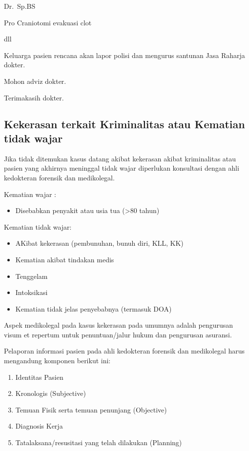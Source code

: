 \documentclass[
]{book}
\providecommand{\tightlist}{%
  \setlength{\itemsep}{0pt}\setlength{\parskip}{0pt}}
\begin{document}
Dr.~Sp.BS

Pro Craniotomi evakuasi clot

dll

Keluarga pasien rencana akan lapor polisi dan mengurus santunan Jasa Raharja dokter.

Mohon adviz dokter.

Terimakasih dokter.

\hypertarget{kekerasan-terkait-kriminalitas-atau-kematian-tidak-wajar}{%
\subsection{Kekerasan terkait Kriminalitas atau Kematian tidak wajar}\label{kekerasan-terkait-kriminalitas-atau-kematian-tidak-wajar}}

Jika tidak ditemukan kasus datang akibat kekerasan akibat kriminalitas atau pasien yang akhirnya meninggal tidak wajar diperlukan konsultasi dengan ahli kedokteran forensik dan medikolegal.

Kematian wajar :

\begin{itemize}
\tightlist
\item
  Disebabkan penyakit atau usia tua (\textgreater80 tahun)
\end{itemize}

Kematian tidak wajar:

\begin{itemize}
\item
  AKibat kekerasan (pembunuhan, bunuh diri, KLL, KK)
\item
  Kematian akibat tindakan medis
\item
  Tenggelam
\item
  Intoksikasi
\item
  Kematian tidak jelas penyebabnya (termasuk DOA)
\end{itemize}

Aspek medikolegal pada kasus kekerasan pada umumnya adalah pengurusan visum et repertum untuk penuntuan/jalur hukum dan pengurusan asuransi.

Pelaporan informasi pasien pada ahli kedokteran forensik dan medikolegal harus mengandung komponen berikut ini:

\begin{enumerate}
\def\labelenumi{\arabic{enumi}.}
\item
  Identitas Pasien
\item
  Kronologis (Subjective)
\item
  Temuan Fisik serta temuan penunjang (Objective)
\item
  Diagnosis Kerja
\item
  Tatalaksana/resusitasi yang telah dilakukan (Planning)
\end{enumerate}
\end{document}
